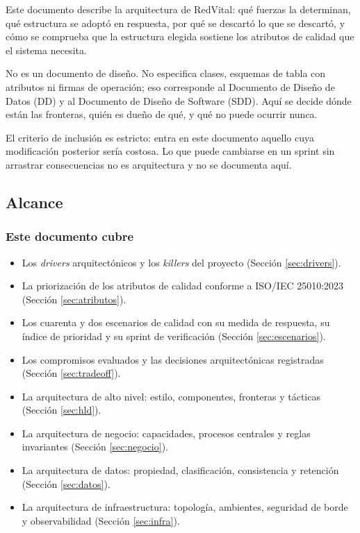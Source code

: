 \documentclass[11pt,a4paper]{article}
\begin{document}
Este documento describe la arquitectura de RedVital: qué fuerzas la determinan, qué estructura se adoptó en respuesta, por qué se descartó lo que se descartó, y cómo se comprueba que la estructura elegida sostiene los atributos de calidad que el sistema necesita.

No es un documento de diseño. No especifica clases, esquemas de tabla con atributos ni firmas de operación; eso corresponde al Documento de Diseño de Datos (DD) y al Documento de Diseño de Software (SDD). Aquí se decide dónde están las fronteras, quién es dueño de qué, y qué no puede ocurrir nunca.

El criterio de inclusión es estricto: entra en este documento aquello cuya modificación posterior sería costosa. Lo que puede cambiarse en un sprint sin arrastrar consecuencias no es arquitectura y no se documenta aquí.

\subsection{Alcance}

\subsubsection*{Este documento cubre}

\begin{itemize}
\item Los \emph{drivers} arquitectónicos y los \emph{killers} del proyecto (Sección \ref{sec:drivers}).
\item La priorización de los atributos de calidad conforme a ISO/IEC 25010:2023 (Sección \ref{sec:atributos}).
\item Los cuarenta y dos escenarios de calidad con su medida de respuesta, su índice de prioridad y su sprint de verificación (Sección \ref{sec:escenarios}).
\item Los compromisos evaluados y las decisiones arquitectónicas registradas (Sección \ref{sec:tradeoff}).
\item La arquitectura de alto nivel: estilo, componentes, fronteras y tácticas (Sección \ref{sec:hld}).
\item La arquitectura de negocio: capacidades, procesos centrales y reglas invariantes (Sección \ref{sec:negocio}).
\item La arquitectura de datos: propiedad, clasificación, consistencia y retención (Sección \ref{sec:datos}).
\item La arquitectura de infraestructura: topología, ambientes, seguridad de borde y observabilidad (Sección \ref{sec:infra}).
\end{itemize}
\end{document}
